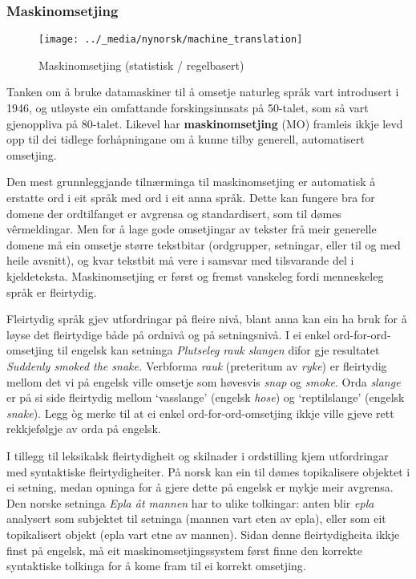 \begin{multicols}{2}
\subsubsection{Maskinomsetjing}

\begin{figure*}[htb]
  \center
  \texttt{[image: ../\_media/nynorsk/machine\_translation]}
  \caption{Maskinomsetjing (statistisk / regelbasert)}
  \label{fig:mtarch_no}
\end{figure*}

Tanken om å bruke datamaskiner til å omsetje naturleg språk vart introdusert i 1946, og utløyste ein omfattande forskingsinnsats på 50-talet, som så vart gjenoppliva på 80-talet. Likevel har \textbf{maskinomsetjing} (MO) framleis ikkje levd opp til dei tidlege forhåpningane om å kunne tilby generell, automatisert omsetjing.


Den mest grunnleggjande tilnærminga til maskinomsetjing er automatisk å erstatte ord i eit språk med ord i eit anna språk. Dette kan fungere bra for domene der ordtilfanget er avgrensa og standardisert, som til dømes vêrmeldingar. Men for å lage gode omsetjingar av tekster frå meir generelle domene må ein omsetje større tekstbitar (ordgrupper, setningar, eller til og med heile avsnitt), og kvar tekstbit må vere i samsvar med tilsvarande del i kjeldeteksta. Maskinomsetjing er først og fremst vanskeleg fordi menneskeleg språk er fleirtydig. 

Fleirtydig språk gjev utfordringar på fleire nivå, blant anna kan ein ha bruk for å løyse det fleirtydige både på ordnivå og på setningsnivå. 
I ei enkel ord-for-ord-omsetjing til engelsk kan setninga \textit{Plutseleg rauk slangen} difor gje resultatet \textit{Suddenly smoked the snake.}
Verbforma \textit{rauk} (preteritum av \textit{ryke}) er fleirtydig mellom det vi på engelsk ville omsetje som høvesvis \textit{snap} og \textit{smoke}.
Orda \textit{slange} er på si side fleirtydig mellom `vasslange' (engelsk \textit{hose}) og `reptilslange' (engelsk \textit{snake}). Legg òg merke til at ei enkel ord-for-ord-omsetjing ikkje ville gjeve rett rekkjefølgje av orda på engelsk.

I tillegg til leksikalsk fleirtydigheit og skilnader i ordstilling kjem utfordringar med syntaktiske fleirtydigheiter. På norsk kan ein til dømes topikalisere objektet i ei setning, medan opninga for å gjere dette på engelsk er mykje meir avgrensa. Den norske setninga \textit{Epla åt mannen} har to ulike tolkingar: anten blir \textit{epla} analysert som subjektet til setninga (mannen vart eten av epla), eller som eit topikalisert objekt (epla vart etne av mannen). Sidan denne fleirtydigheita ikkje finst på engelsk, må eit maskinomsetjingssystem først finne den korrekte syntaktiske tolkinga for å kome fram til ei korrekt omsetjing.


\end{multicols}
